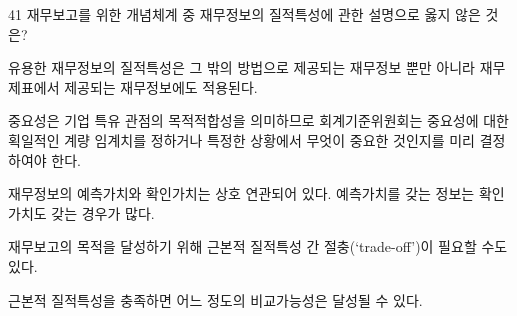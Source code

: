 \begin{question}{41}
재무보고를 위한 개념체계 중 재무정보의 질적특성에 관한 설명으로 옳지 않은 것은?
\begin{choices}
  \item 유용한 재무정보의 질적특성은 그 밖의 방법으로 제공되는 재무정보 뿐만 아니라 재무제표에서 제공되는 재무정보에도 적용된다.
  \item 중요성은 기업 특유 관점의 목적적합성을 의미하므로 회계기준위원회는 중요성에 대한 획일적인 계량 임계치를 정하거나 특정한 상황에서 무엇이 중요한 것인지를 미리 결정하여야 한다.
  \item 재무정보의 예측가치와 확인가치는 상호 연관되어 있다. 예측가치를 갖는 정보는 확인가치도 갖는 경우가 많다.
  \item 재무보고의 목적을 달성하기 위해 근본적 질적특성 간 절충(‘trade-off’)이 필요할 수도 있다.
  \item 근본적 질적특성을 충족하면 어느 정도의 비교가능성은 달성될 수 있다.
\end{choices}
\end{question}
